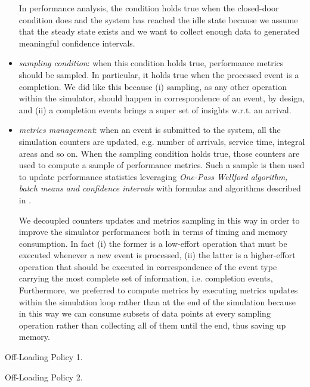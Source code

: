 \begin{itemize}
	In performance analysis, the condition holds true when the closed-door condition does and the system has reached the idle state because we assume that the steady state exists and we want to collect enough data to generated meaningful confidence intervals.
	
	\item \textit{sampling condition}: when this condition holds true, performance metrics should be sampled. 
	In particular, it holds true when the processed event is a completion. 
	We did like this because 
	(i) sampling, as any other operation within the simulator, should happen in correspondence of an event, by design, and
	(ii) a completion events brings a super set of insights w.r.t. an arrival.
	
	
	\item \textit{metrics management}: when an event is submitted to the system, all the simulation counters are updated, e.g. number of arrivals, service time, integral areas and so on. 
	When the sampling condition holds true, those counters are used to compute a sample of performance metrics. Such a sample is then used to update performance statistics leveraging \textit{One-Pass Wellford algorithm, batch means and confidence intervals} with formulas and algorithms described in \cite{leemis2006discrete}.
	
	We decoupled counters updates and metrics sampling in this way in order to improve the simulator performances both in terms of timing and memory consumption.
	In fact
	(i) the former is a low-effort operation that must be executed whenever a new event is processed,
	(ii) the latter is a higher-effort operation that should be executed in correspondence of the event type carrying the most complete set of information, i.e. completion events,
	Furthermore, we preferred to compute metrics by executing metrics updates within the simulation loop rather than at the end of the simulation because in this way we can consume subsets of data points at every sampling operation rather than collecting all of them until the end, thus saving up memory.
\end{itemize}

\begin{algorithm}
	\SetAlgoLined
	\caption{Off-Loading Policy 1.}
	\label{alg:off-loading-policy-1}
\end{algorithm}

\begin{algorithm}
	\SetAlgoLined
	\caption{Off-Loading Policy 2.}
	\label{alg:off-loading-policy-2}
\end{algorithm}

